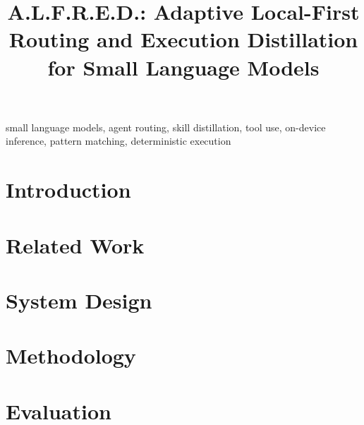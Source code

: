 \documentclass[conference,a4paper]{IEEEtran}
\begin{document}
\title{A.L.F.R.E.D.: Adaptive Local-First Routing and Execution Distillation for Small Language Models}

\author{
\and
{}
}

\maketitle

\begin{abstract}

\end{abstract}

\begin{IEEEkeywords}
small language models, agent routing, skill distillation, tool use, on-device inference, pattern matching, deterministic execution
\end{IEEEkeywords}

\section{Introduction}


\section{Related Work}


\section{System Design}


\section{Methodology}


\section{Evaluation}

\end{document}
